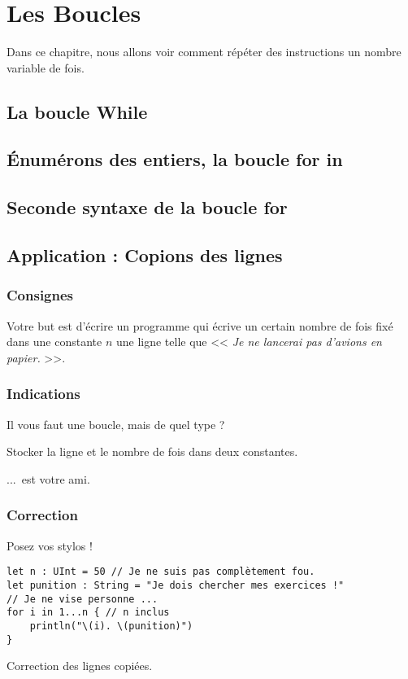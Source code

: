 \chapter{Les Boucles}
Dans ce chapitre, nous allons voir comment
répéter des instructions un nombre variable de fois.
\section{La boucle While}
\section{Énumérons des entiers, la boucle for in}
\section{Seconde syntaxe de la boucle for}
\section{Application : Copions des lignes}
\subsection{Consignes}
Votre but est d'écrire un programme qui
écrive un certain nombre de fois fixé dans une constante $n$ une ligne telle que << \emph{Je ne lancerai pas d'avions en papier.} >>.
\pagebreak %
\subsection{Indications}
Il vous faut une boucle, mais de quel type ?

Stocker la ligne et le nombre de fois dans deux constantes.

...\ est votre ami.
\pagebreak %
\subsection{Correction}
Posez vos stylos !
\begin{listing}[h]
\begin{verbatim}
let n : UInt = 50 // Je ne suis pas complètement fou.
let punition : String = "Je dois chercher mes exercices !"
// Je ne vise personne ...
for i in 1...n { // n inclus
    println("\(i). \(punition)")
}
\end{verbatim}
\caption{Correction des lignes copiées.}
\end{listing}%
